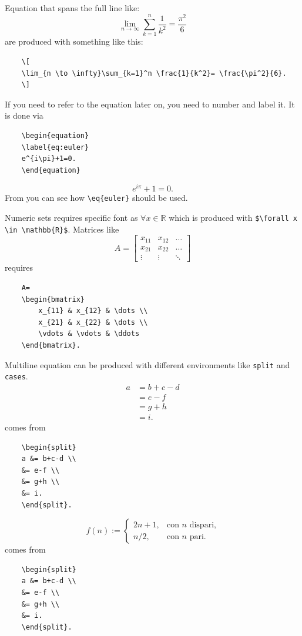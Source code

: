 Equation that spans the full line like:
\[
\lim_{n \to \infty}\sum_{k=1}^n \frac{1}{k^2}= \frac{\pi^2}{6}
\]
are produced with something like this:
\begin{verbatim}
	\[
	\lim_{n \to \infty}\sum_{k=1}^n \frac{1}{k^2}= \frac{\pi^2}{6}.
	\]
\end{verbatim}
If you need to refer to the equation later on, you need to number and label it. It is done via
\begin{verbatim}
	\begin{equation}
	\label{eq:euler}
	e^{i\pi}+1=0.
	\end{equation}
\end{verbatim}
\begin{equation}
	\label{eq:euler}
	e^{i\pi}+1=0.
\end{equation}
From  you can see how \verb!\eq{euler}! should be used.

Numeric sets requires specific font as $\forall x \in \mathbb{R}$ which is produced with \verb!$\forall x \in \mathbb{R}$!. Matrices like
\[
A=
\begin{bmatrix}
x_{11} & x_{12} & \dots \\
x_{21} & x_{22} & \dots \\
\vdots & \vdots & \ddots
\end{bmatrix}
\]
requires
\begin{verbatim}
	A=
	\begin{bmatrix}
		x_{11} & x_{12} & \dots \\
		x_{21} & x_{22} & \dots \\
		\vdots & \vdots & \ddots
	\end{bmatrix}.
\end{verbatim}
Multiline equation can be produced with different environments like \verb!split! and \verb!cases!.
\[ 
\begin{split} 
a &= b+c-d \\ 
  &= e-f \\ 
  &= g+h \\ 
  &= i. 
\end{split} 
\]
comes from
\begin{verbatim}
	\begin{split} 
	a &= b+c-d \\ 
 	&= e-f \\ 
	&= g+h \\ 
	&= i. 
	\end{split}. 
\end{verbatim}
\[
f(n):=
\begin{cases} 
2n+1, & \text{con $n$ dispari,} \\ 
n/2,  & \text{con $n$ pari.} 
\end{cases} 
\]
comes from
\begin{verbatim}
	\begin{split} 
	a &= b+c-d \\ 
 	&= e-f \\ 
	&= g+h \\ 
	&= i. 
	\end{split}. 
\end{verbatim}

